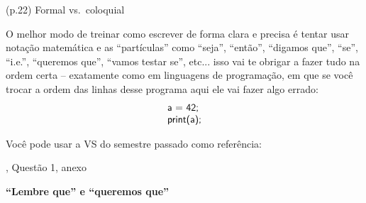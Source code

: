 \documentclass[oneside,12pt]{article}
\begin{document}
{{ (p.22) Formal vs.\ coloquial

\bsk

O melhor modo de treinar como escrever de forma clara e precisa é
tentar usar  notação matemática e as ``partículas'' como
``seja'', ``então'', ``digamos que'', ``se'', ``i.e.'', ``queremos
que'', ``vamos testar se'', etc... isso vai te obrigar a fazer tudo na
ordem certa -- exatamente como em linguagens de programação, em que se
você trocar a ordem das linhas desse programa aqui ele vai fazer algo
errado:
%
$$\begin{tabular}{l}
  \textsf{a = 42;}   \\
  \textsf{print(a);} \\
  \end{tabular}
$$

\msk

Você pode usar a VS do semestre passado como referência:

,  Questão 1, anexo



}}

\newpage


{\bf ``Lembre que'' e ``queremos que''}

\end{document}
